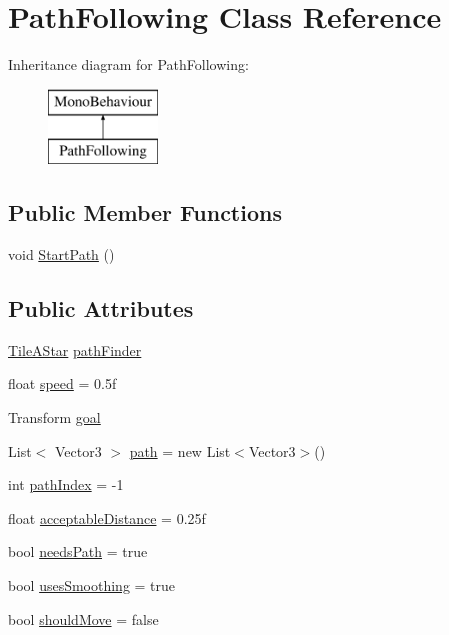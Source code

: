 \hypertarget{class_path_following}{}\section{Path\+Following Class Reference}
\label{class_path_following}
Inheritance diagram for Path\+Following\+:\begin{figure}[H]
\begin{center}
\leavevmode
\includegraphics[height=2.000000cm]{class_path_following}
\end{center}
\end{figure}
\subsection*{Public Member Functions}
\begin{DoxyCompactItemize}
\item 
void \mbox{\hyperlink{class_path_following_a2b80587b5939c9e6c4b8428c357ca6dd}{Start\+Path}} ()
\end{DoxyCompactItemize}
\subsection*{Public Attributes}
\begin{DoxyCompactItemize}
\item 
\mbox{\hyperlink{class_tile_a_star}{Tile\+A\+Star}} \mbox{\hyperlink{class_path_following_aebd9ee9093f350ad3ecc77b51e83910a}{path\+Finder}}
\item 
float \mbox{\hyperlink{class_path_following_a49b1482d4ff9c77a24e86d7cd05322c5}{speed}} = 0.\+5f
\item 
Transform \mbox{\hyperlink{class_path_following_a59519acae127788d7ed4d3a5aff64a82}{goal}}
\item 
List$<$ Vector3 $>$ \mbox{\hyperlink{class_path_following_ac4a4b53022913ec510ae0d6e63836151}{path}} = new List$<$Vector3$>$()
\item 
int \mbox{\hyperlink{class_path_following_abffab101a600ffd65d09044089a56352}{path\+Index}} = -\/1
\item 
float \mbox{\hyperlink{class_path_following_a04b81f97ff5a50de9e33fa06adb0b0e1}{acceptable\+Distance}} = 0.\+25f
\item 
bool \mbox{\hyperlink{class_path_following_ad8b5497dee6c46c8a3e37353c7f41cdf}{needs\+Path}} = true
\item 
bool \mbox{\hyperlink{class_path_following_ac9f0499d23632e1ebc46c69cea2c615b}{uses\+Smoothing}} = true
\item 
bool \mbox{\hyperlink{class_path_following_a070098fa92eeae99442f12c2af232b3e}{should\+Move}} = false
\end{DoxyCompactItemize}


